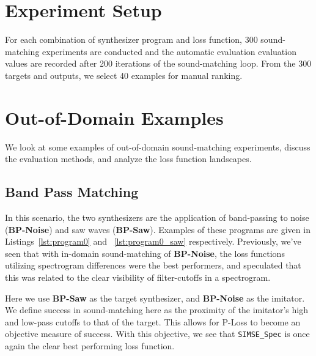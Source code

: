 \documentclass{article} %
\newcommand{\SIMSESpec}{\texttt{SIMSE\_Spec}\xspace}
\newcommand{\BPNoise}{\textbf{BP-Noise}\xspace}
\newcommand{\BPSaw}{\textbf{BP-Saw}\xspace}
\begin{document}
\section{Experiment Setup}
\label{sec:experiment_setup}
For each combination of synthesizer program and loss function, 300 sound-matching experiments are conducted and the automatic evaluation evaluation values are recorded after 200 iterations of the sound-matching loop. From the 300 targets and outputs, we select 40 examples for manual ranking. 


\section{Out-of-Domain Examples}
We look at some examples of out-of-domain sound-matching experiments, discuss the evaluation methods, and analyze the loss function landscapes. 

\subsection{Band Pass Matching}
In this scenario, the two synthesizers are the application of band-passing to noise (\BPNoise) and saw waves (\BPSaw). Examples of these programs are given in Listings~\ref{lst:program0} and ~\ref{lst:program0_saw} respectively. Previously, we've seen that with in-domain sound-matching of \BPNoise, the loss functions utilizing spectrogram differences were the best performers, and speculated that this was related to the clear visibility of filter-cutoffs in a spectrogram. 
 
 Here we use \BPSaw as the target synthesizer, and \BPNoise as the imitator. We define success in sound-matching here as the proximity of the imitator's high and low-pass cutoffs to that of the target. This allows for P-Loss to become an objective measure of success. With this objective, we see that \SIMSESpec is once again the clear best performing loss function.
\end{document}
